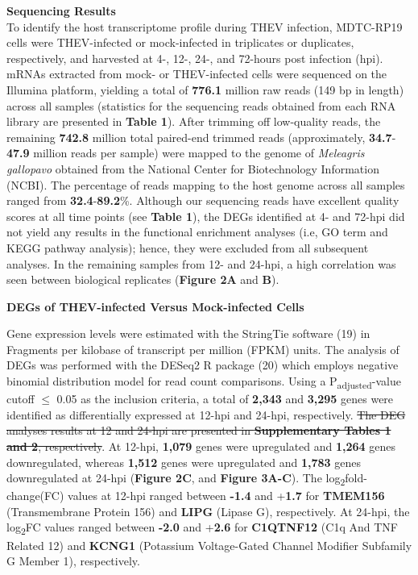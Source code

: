 \documentclass[
]{article}
\begin{document}
\textbf{Sequencing Results}\\
To identify the host transcriptome profile during THEV infection,
MDTC-RP19 cells were THEV-infected or mock-infected in triplicates or
duplicates, respectively, and harvested at 4-, 12-, 24-, and 72-hours
post infection (hpi). mRNAs extracted from mock- or THEV-infected cells
were sequenced on the Illumina platform, yielding a total of
\textbf{776.1} million raw reads (149 bp in length) across all samples
(statistics for the sequencing reads obtained from each RNA library are
presented in \textbf{Table 1}). After trimming off low-quality reads,
the remaining \textbf{742.8} million total paired-end trimmed reads
(approximately, \textbf{34.7}-\textbf{47.9} million reads per sample)
were mapped to the genome of \emph{Meleagris gallopavo} obtained from
the National Center for Biotechnology Information (NCBI). The percentage
of reads mapping to the host genome across all samples ranged from
\textbf{32.4}-\textbf{89.2}\%. Although our sequencing reads have
excellent quality scores at all time points (see \textbf{Table 1}), the
DEGs identified at 4- and 72-hpi did not yield any results in the
functional enrichment analyses (i.e, GO term and KEGG pathway analysis);
hence, they were excluded from all subsequent analyses. In the remaining
samples from 12- and 24-hpi, a high correlation was seen between
biological replicates (\textbf{Figure 2A} and \textbf{B}).

\textbf{DEGs of THEV-infected Versus Mock-infected Cells}

Gene expression levels were estimated with the StringTie software (19)
in Fragments per kilobase of transcript per million (FPKM) units. The
analysis of DEGs was performed with the DESeq2 R package (20) which
employs negative binomial distribution model for read count comparisons.
Using a P\textsubscript{adjusted}-value cutoff \(\leq\) 0.05 as the
inclusion criteria, a total of \textbf{2,343} and \textbf{3,295} genes
were identified as differentially expressed at 12-hpi and 24-hpi,
respectively. \st{The DEG analyses results at 12 and 24-hpi are
presented in \textbf{Supplementary Tables 1 and 2}, respectively}. At
12-hpi, \textbf{1,079} genes were upregulated and \textbf{1,264} genes
downregulated, whereas \textbf{1,512} genes were upregulated and
\textbf{1,783} genes downregulated at 24-hpi (\textbf{Figure 2C}, and
\textbf{Figure 3A-C}). The log\textsubscript{2}fold-change(FC) values at
12-hpi ranged between \textbf{-1.4} and +\textbf{1.7} for
\textbf{TMEM156} (Transmembrane Protein 156) and \textbf{LIPG} (Lipase
G), respectively. At 24-hpi, the log\textsubscript{2}FC values ranged
between \textbf{-2.0} and +\textbf{2.6} for \textbf{C1QTNF12} (C1q And
TNF Related 12) and \textbf{KCNG1} (Potassium Voltage-Gated Channel
Modifier Subfamily G Member 1), respectively.
\end{document}
